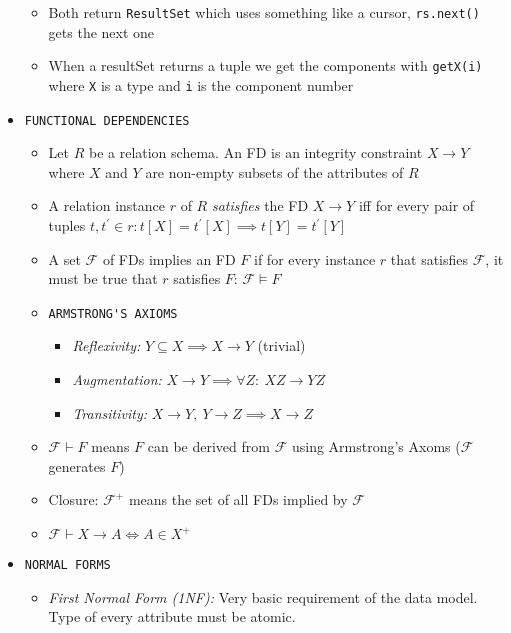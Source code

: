 \documentclass[landscape,8pt]{extarticle}
\newcommand{\code}{\lstinline}
\begin{document}
\begin{multicols}{4}
\begin{itemize}
\begin{itemize}
        \item Both return \code{ResultSet} which uses something like a cursor, \code{rs.next()} gets
        the next one
        \item When a resultSet returns a tuple we get the components with \code{getX(i)} where
        \code{X} is a type and \code{i} is the component number
    \end{itemize}
    \item \code{FUNCTIONAL DEPENDENCIES}
    \begin{itemize}
        \item Let $R$ be a relation schema. An FD is an integrity constraint $X \rightarrow Y$ where
        $X$ and $Y$ are non-empty subsets of the attributes of $R$
        \item A relation instance $r$ of $R$ \emph{satisfies} the FD $X \rightarrow Y$ iff for every
        pair of tuples $t, t^\prime \in r: t[X] = t^\prime[X] \implies t[Y] = t^\prime[Y]$
        \item A set $\mathcal{F}$ of FDs implies an FD $F$ if for every instance $r$ that satisfies
        $\mathcal{F}$, it must be true that $r$ satisfies $F$: $\mathcal{F} \models F$
        \item \code{ARMSTRONG'S AXIOMS}
        \begin{itemize}
            \item \emph{Reflexivity:} $Y \subseteq X \implies X \rightarrow Y$ (trivial)
            \item \emph{Augmentation:} $X \rightarrow Y \implies \forall Z:\ XZ \rightarrow YZ$
            \item \emph{Transitivity:} $X \rightarrow Y,\ Y \rightarrow Z \implies X \rightarrow Z$
        \end{itemize}
        \item $\mathcal{F} \vdash F$ means $F$ can be derived from $\mathcal{F}$ using Armstrong's
        Axoms ($\mathcal{F}$ generates $F$)
        \item Closure: $\mathcal{F}^+$ means the set of all FDs implied by $\mathcal{F}$
        \item $\mathcal{F} \vdash X \rightarrow A \iff A \in X^+$
    \end{itemize}
    \item \code{NORMAL FORMS}
    \begin{itemize}
        \item \emph{First Normal Form (1NF):} Very basic requirement of the data model. Type of
        every attribute must be atomic.

\end{itemize}
\end{itemize}
\end{multicols}
\end{document}
